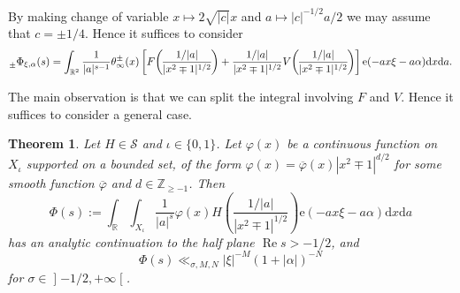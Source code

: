 \documentclass[10pt,oneside,reqno]{amsart}
\newcommand\lopen{\mathopen{]}}
\newcommand\ropen{\mathclose{[}}
\newcommand\rmd{\mathrm{d}}
\newcommand\rme{\mathrm{e}}
\newcommand\cS{\mathcal{S}}
\newcommand\RR{\mathbb{R}}
\newcommand\ZZ{\mathbb{Z}}
\renewcommand\Re{\mathop{\mathrm{Re}}}
\renewcommand\geq{\geqslant}
\newcommand\legendresymbol[2]{\genfrac{(}{)}{}{}{#1}{#2}}
\theoremstyle{THEOREM}
\newtheorem{theorem}{Theorem}[section]
\theoremstyle{DEFINITION}
\theoremstyle{EXERCISE}
\numberwithin{equation}{section}
\begin{document}
By making change of variable $x\mapsto 2\sqrt{|c|}x$ and $a\mapsto |c|^{-1/2}a/2$ we may assume that $c=\pm 1/4$. Hence it suffices to consider
\begin{equation}\label{eq:archimedeanintegralestimate}
\prescript{}{\pm}\Phi_{\xi,\alpha}(s)=\int_{\RR^2}\frac{1}{|a|^{s-1}}\theta_\infty^\pm(x)\left[F\legendresymbol {1/|a|}{|x^2\mp 1|^{1/2}}+ \frac{1/|a|}{|x^2\mp 1|^{1/2}} V\legendresymbol{1/|a|}{|x^2\mp 1|^{1/2}}\right]\rme(-ax\xi-a\alpha)\rmd x\rmd a.
\end{equation}

The main observation is that we can split the integral involving $F$ and $V$. Hence it suffices to consider a general case. 
\begin{theorem}\label{thm:archimedeanintegralestimate}
Let $H\in \cS$ and $\iota\in \{0,1\}$. Let $\varphi(x)$ be a continuous function on $X_\iota$ supported on a bounded set, of the form $\varphi(x)=\overline{\varphi}(x)|x^2\mp 1|^{d/2}$ for some smooth function $\overline{\varphi}$ and $d\in \ZZ_{\geq -1}$.
Then
\[
\Phi(s):=\int_{\RR}\int_{X_\iota}\frac{1}{|a|^{s}}\varphi(x)H\legendresymbol {1/|a|}{|x^2\mp 1|^{1/2}}\rme(-ax\xi-a\alpha)\rmd x\rmd a 
\]
has an analytic continuation to the half plane $\Re s>-1/2$, and 
\[
\Phi(s)\ll_{\sigma,M,N} |\xi|^{-M}(1+|\alpha|)^{-N}
\] 
for $\sigma\in \lopen -1/2,+\infty\ropen$.
\end{theorem}
\end{document}

